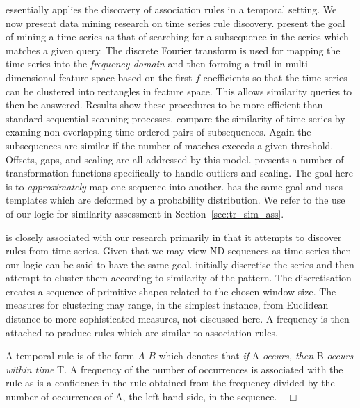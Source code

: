 \cite{sa96} essentially applies the discovery of association rules in a
temporal setting. We now present data mining research on time series
rule discovery. \cite{frm94} present the goal of mining a time series as
that of searching for a subsequence in the series which matches a
given query. The discrete Fourier transform is used for
mapping the time series into the {\em frequency domain} and then forming a
trail in multi-dimensional feature space based on the first $f$
coefficients so that the time series can be clustered into rectangles
in feature space. This allows similarity queries to then be answered. 
Results show these
procedures to be more efficient than standard sequential scanning
processes. \cite{alss95,dgm97,rm97} compare the similarity of time
series by examing non-overlapping time ordered pairs of
subsequences. Again the subsequences are similar if the number of
matches exceeds a given threshold. Offsets, gaps, and scaling are all
addressed by this model. \cite{dgm97} presents a number of
transformation functions specifically to handle outliers and
scaling. The goal here is to {\em approximately} map one sequence into
another. \cite{ks97} has the same goal and uses templates which are
deformed by a probability distribution. We refer to the use of our
logic for similarity assessment in Section~\ref{sec:tr_sim_ass}.

\medskip

\cite{dlm98} is closely associated with our research primarily in that
it attempts to discover rules from time series. Given that we may view ND
sequences as time series then our logic can be said to have the same
goal. \cite{dlm98} initially discretise the series and then attempt to
cluster them according to similarity of the pattern. The
discretisation creates a sequence of primitive shapes related to the
chosen window size. The measures for clustering may range, in the
simplest instance, from Euclidean distance to more sophisticated
measures, not discussed here. A frequency is then attached to produce
rules which are similar to association rules.


\begin{definition}
\begin{rm}
A temporal rule is of the form $A$
 $B$
which denotes that {\em if} A {\em occurs, then} B {\em occurs within
time} T. A 
frequency of the number of occurrences is associated with the rule as
is a confidence in the rule obtained from the frequency divided by the
number of occurrences of A, the left hand side, in the sequence.$\quad\Box$
\end{rm}
\end{definition}

